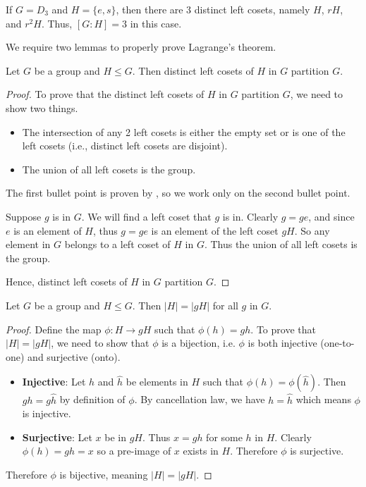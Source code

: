 \begin{example}
    If $G = D_3$ and $H = \{e, s\}$, then there are 3 distinct left cosets, namely $H$, $rH$, and $r^2H$. Thus, $[G:H] = 3$ in this case.
\end{example}

We require two lemmas to properly prove Lagrange's theorem.
\begin{lemma}\label{lemma-left-coset-partition}
    Let $G$ be a group and $H \leq G$. Then distinct left cosets of $H$ in $G$ partition $G$.
\end{lemma}
\begin{proof}
    To prove that the distinct left cosets of $H$ in $G$ partition $G$, we need to show two things.
    \begin{itemize}
        \item The intersection of any 2 left cosets is either the empty set or is one of the left cosets (i.e., distinct left cosets are disjoint).
        \item The union of all left cosets is the group.
    \end{itemize}
    The first bullet point is proven by , so we work only on the second bullet point.

    Suppose $g$ is in $G$. We will find a left coset that $g$ is in. Clearly $g = ge$, and since $e$ is an element of $H$, thus $g = ge$ is an element of the left coset $gH$. So any element in $G$ belongs to a left coset of $H$ in $G$. Thus the union of all left cosets is the group.

    Hence, distinct left cosets of $H$ in $G$ partition $G$.
\end{proof}

\begin{lemma}\label{lemma-order-of-coset}
    Let $G$ be a group and $H \leq G$. Then $|H| = |gH|$ for all $g$ in $G$.
\end{lemma}
\begin{proof}
    Define the map $\phi: H \to gH$ such that $\phi(h) = gh$. To prove that $|H| = |gH|$, we need to show that $\phi$ is a bijection, i.e. $\phi$ is both injective (one-to-one) and surjective (onto).
    \begin{itemize}
        \item \textbf{Injective}: Let $h$ and $\hat{h}$ be elements in $H$ such that $\phi(h) = \phi(\hat{h})$. Then $gh = g\hat{h}$ by definition of $\phi$. By cancellation law, we have $h = \hat{h}$ which means $\phi$ is injective.
        \item \textbf{Surjective}: Let $x$ be in $gH$. Thus $x = gh$ for some $h$ in $H$. Clearly $\phi(h) = gh = x$ so a pre-image of $x$ exists in $H$. Therefore $\phi$ is surjective.
    \end{itemize}
    Therefore $\phi$ is bijective, meaning $|H| = |gH|$.
\end{proof}

